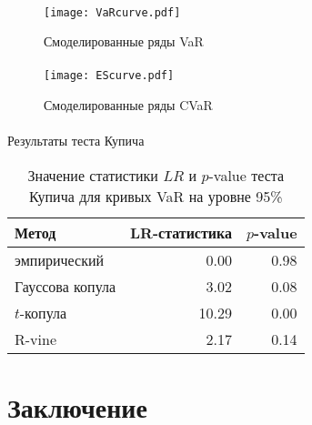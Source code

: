 \documentclass[aspectratio=169]{beamer}
\begin{document}
\begin{frame}{\insertsection}
    \framesubtitle{\insertsubsection}
    \begin{figure}
        \centering
        \texttt{[image: VaRcurve.pdf]}
        \caption{Смоделированные ряды VaR}
    \end{figure}
\end{frame}

\begin{frame}{\insertsection}
    \framesubtitle{\insertsubsection}
    \begin{figure}
        \centering
        \texttt{[image: EScurve.pdf]}
        \caption{Смоделированные ряды CVaR}
    \end{figure}
\end{frame}

\begin{frame}{\insertsection}
    \framesubtitle{\insertsubsection}
    \begin{block}{Результаты теста Купича}
    \begin{table}
        \centering
        \caption{Значение статистики $LR$ и $p$-value теста Купича для кривых VaR на уровне 95\%}
        \label{tab:kupiec}
        \setlength{\tabcolsep}{10pt}
        \begin{tabular}{lrr} \toprule
            Метод & LR-статистика & $p$-value \\ \midrule
            эмпирический & 0.00 & 0.98 \\
            Гауссова копула & 3.02 & 0.08 \\
            $t$-копула & 10.29 & 0.00 \\
            R-vine & 2.17 & 0.14 \\ \bottomrule
        \end{tabular}
    \end{table}
    \end{block}
\end{frame}

\section{Заключение}
\end{document}
